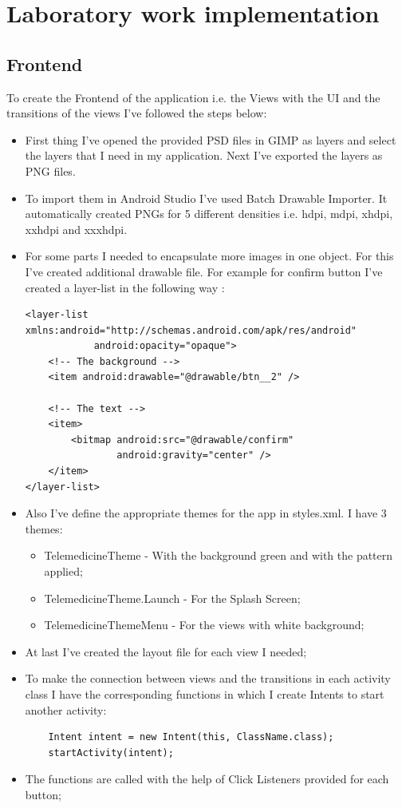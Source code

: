 \section{Laboratory work implementation}

\subsection{Frontend}

To create the Frontend of the application i.e. the Views with the UI and the transitions of the views I've followed the steps below:

\begin{itemize}
	\item First thing I've opened the provided PSD files in GIMP as layers and select the layers that I need in my application. Next I've exported the layers as PNG files.
	\item To import them in Android Studio I've used Batch Drawable Importer. It automatically created PNGs for 5 different densities i.e. hdpi, mdpi, xhdpi, xxhdpi and xxxhdpi.
	\item For some parts I needed to encapsulate more images in one object. For this I've created additional drawable file. For example for confirm button I've created a layer-list in the following way : 
	\begin{lstlisting}
<layer-list xmlns:android="http://schemas.android.com/apk/res/android" 
			android:opacity="opaque">
	<!-- The background -->
	<item android:drawable="@drawable/btn__2" />
	
	<!-- The text -->
	<item>
		<bitmap android:src="@drawable/confirm"
				android:gravity="center" />
	</item>
</layer-list>
	\end{lstlisting}
	\item Also I've define the appropriate themes for the app in styles.xml. I have 3 themes:
	\begin{itemize}
		\item TelemedicineTheme - With the background green and with the pattern applied;
		\item TelemedicineTheme.Launch - For the Splash Screen;
		\item TelemedicineThemeMenu - For the views with white background;
	\end{itemize}
	\item At last I've created the layout file for each view I needed;
	\item To make the connection between views and the transitions in each activity class I have the corresponding functions in which I create Intents to start another activity:
	\begin{lstlisting}
	Intent intent = new Intent(this, ClassName.class);
	startActivity(intent);
	\end{lstlisting} 
	\item The functions are called with the help of Click Listeners provided for each button; 
\end{itemize}

